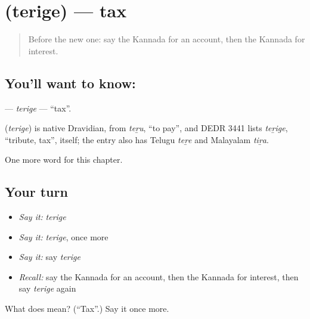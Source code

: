 \section[\texorpdfstring{\kn{ತೆರಿಗೆ} (terige)}{ತೆರಿಗೆ (terige)}]{ (terige) — tax}

\label{lesson:KA-C195-terige}



\begin{quote}
Before the new one: say the Kannada for an account, then the Kannada for interest.
\end{quote}

\subsection*{You'll want to know: }
\textbf{} — \emph{terige} — \textquotedblleft{}tax\textquotedblright{}.

\begin{cousinweb}
\textbf{} (\emph{terige}) is native Dravidian, from \emph{teṟu}, \textquotedblleft{}to pay\textquotedblright{}, and DEDR 3441 lists \emph{teṟige}, \textquotedblleft{}tribute, tax\textquotedblright{}, itself; the entry also has Telugu \emph{teṟe} and Malayalam \emph{tiṟa}.
\end{cousinweb}

\begin{grammarlens}[title={What you've built}]
One more word for this chapter.
\end{grammarlens}

\subsection*{Your turn}
\begin{itemize}
\raggedright
  \item \emph{Say it:} \emph{terige}
  \item \emph{Say it:} \emph{terige}, once more
  \item \emph{Say it:} say \emph{terige}
  \item \emph{Recall:} say the Kannada for an account, then the Kannada for interest, then say \emph{terige} again
\end{itemize}

\begin{tcolorbox}[breakable,colback=teal!4,colframe=teal!35!black,title={Before you move on}]
What does  mean? (\textquotedblleft{}Tax\textquotedblright{}.) Say it once more.
\end{tcolorbox}
